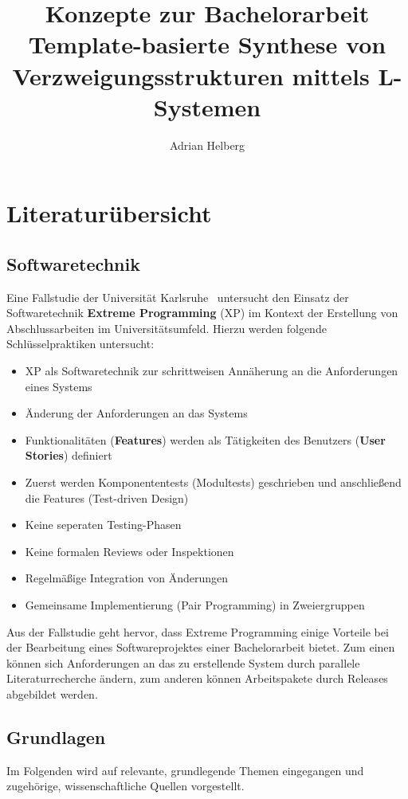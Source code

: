 \documentclass[11pt]{article}
\title{\textbf{Konzepte} zur Bachelorarbeit\\\large{Template-basierte Synthese von\\Verzweigungsstrukturen mittels
L-Systemen}}
\author{Adrian Helberg}
\begin{document}
    \maketitle
    \tableofcontents
    \newpage
    \section{Literaturübersicht}
    \subsection{Softwaretechnik}
    Eine Fallstudie der Universität Karlsruhe~\cite{1} untersucht den Einsatz der Softwaretechnik \textbf{Extreme
    Programming}
    (XP) im Kontext der Erstellung von Abschlussarbeiten im Universitätsumfeld.
    Hierzu werden folgende Schlüsselpraktiken untersucht:
    \begin{itemize}
        \item XP als Softwaretechnik zur schrittweisen Annäherung an die Anforderungen eines Systems
        \item Änderung der Anforderungen an das Systems
        \item Funktionalitäten (\textbf{Features}) werden als Tätigkeiten des Benutzers (\textbf{User Stories}) definiert
        \item Zuerst werden Komponententests (Modultests) geschrieben und anschließend die Features (Test-driven Design)
        \item Keine seperaten Testing-Phasen
        \item Keine formalen Reviews oder Inspektionen
        \item Regelmäßige Integration von Änderungen
        \item Gemeinsame Implementierung (Pair Programming) in Zweiergruppen
    \end{itemize}
    Aus der Fallstudie geht hervor, dass Extreme Programming einige Vorteile bei der Bearbeitung eines Softwareprojektes
    einer Bachelorarbeit bietet.
    Zum einen können sich Anforderungen an das zu erstellende System durch parallele Literaturrecherche ändern, zum
    anderen können Arbeitspakete durch Releases abgebildet werden.

    \subsection{Grundlagen}
    Im Folgenden wird auf relevante, grundlegende Themen eingegangen und zugehörige, wissenschaftliche Quellen
    vorgestellt.
\end{document}
